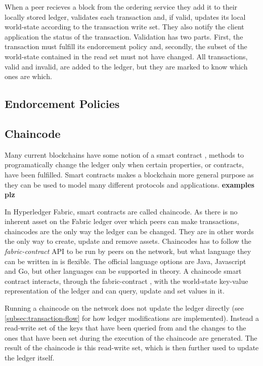\documentclass[english, biblatex, digitaloutput]{kththesis}
\begin{document}
When a peer recieves a block from the ordering service they add it to their locally stored ledger, validates each transaction and, if valid, updates its local world-state according to the transaction write set. They also notify the client application the status of the transaction. Validation has two parts. First, the transaction must fulfill its endorcement policy and, secondly, the subset of the world-state contained in the read set must not have changed. All transactions, valid and invalid, are added to the ledger, but they are marked to know which ones are which.




\subsection{Endorcement Policies}

\subsection{Chaincode}

Many current blockchains have some notion of a smart contract \cite{di_pierro_what_2017}, \ie methods to programatically change the ledger only when certain properties, or contracts, have been fulfilled. Smart contracts makes a blockchain more general purpose as they can be used to model many different protocols and applications. \textbf{examples plz}

In Hyperledger Fabric, smart contracts are called chaincode. As there is no inherent asset on the Fabric ledger over which peers can make transactions, chaincodes are the only way the ledger can be changed. They are in other words the only way to create, update and remove assets. Chaincodes has to follow the \textit{fabric-contract} \gls{API} to be run by peers on the network, but what language they can be written in is flexible. The official language options are Java, Javascript and Go, but other languages can be supported in theory. A chaincode smart contract interacts, through the fabric-contract , with the world-state key-value representation of the ledger and can query, update and set values in it.

Running a chaincode on the network does not update the ledger directly (see \ref{subsec:transaction-flow} for how ledger modifications are implemented). Instead a read-write set of the keys that have been queried from and the changes to the ones that have been set during the execution of the chaincode are generated. The result of the chaincode is this read-write set, which is then further used to update the ledger itself.
\end{document}
